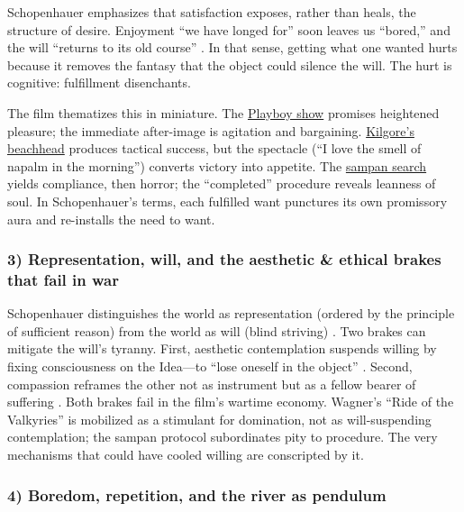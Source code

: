 Schopenhauer emphasizes that satisfaction exposes, rather than heals, the structure of desire.
Enjoyment ``we have longed for'' soon leaves us ``bored,'' and the will ``returns to its old
course'' \parencite[p.~319]{SchopenhauerWWR1969}. In that sense, getting what one wanted hurts
because it removes the fantasy that the object could silence the will. The hurt is cognitive:
fulfillment disenchants.

The film thematizes this in miniature. The \hyperref[scene:playboy-show]{Playboy show}
promises heightened pleasure; the immediate after-image is agitation and bargaining.
\hyperref[scene:kilgore-beach]{Kilgore's beachhead} produces tactical success, but the
spectacle (``I love the smell of napalm in the morning'') converts victory into appetite. The
\hyperref[scene:sampan]{sampan search} yields compliance, then horror; the ``completed''
procedure reveals leanness of soul. In Schopenhauer's terms, each fulfilled want punctures its own
promissory aura and re-installs the need to want.

\subsubsection*{3) Representation, will, and the aesthetic \& ethical brakes that fail in war}

Schopenhauer distinguishes the world as representation (ordered by the principle of sufficient
reason) from the world as will (blind striving) \parencite[pp.~3--5]{SchopenhauerWWR1969}.
Two brakes can mitigate the will's tyranny. First, aesthetic contemplation suspends willing by
fixing consciousness on the Idea—to ``lose oneself in the object''
\parencite[p.~178]{SchopenhauerWWR1969}. Second, compassion reframes the other not as instrument
but as a fellow bearer of suffering \parencite[pp.~372--374]{SchopenhauerWWR1969}.
Both brakes fail in the film's wartime economy. Wagner's ``Ride of the Valkyries'' is mobilized
as a stimulant for domination, not as will-suspending contemplation; the sampan protocol
subordinates pity to procedure. The very mechanisms that could have cooled willing are
conscripted by it.

\subsubsection*{4) Boredom, repetition, and the river as pendulum}

